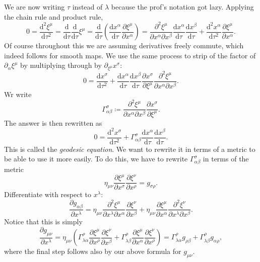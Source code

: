 We are now writing $\tau $ instead of $\lambda $ because the prof's notation got lazy. Applying the chain rule and product rule,
\[
	0=\frac{\mathrm{d}^2\xi ^\mu }{\mathrm{d}\tau ^2} =\frac{\mathrm{d}}{\mathrm{d}\tau } \frac{\mathrm{d}}{\mathrm{d}\tau } \xi ^\mu =\frac{\mathrm{d}}{\mathrm{d}\tau } \left( \frac{\mathrm{d}x^\alpha }{\mathrm{d}\tau } \frac{\partial \xi ^\mu }{\partial x^\alpha }  \right) =\frac{\partial ^2\xi ^\mu }{\partial x^\alpha \partial x^\beta } \frac{\mathrm{d}x^\alpha }{\mathrm{d}\tau } \frac{\mathrm{d}x^\beta }{\mathrm{d}\tau } +\frac{\mathrm{d}^2x^\alpha }{\mathrm{d}\tau ^2} \frac{\partial \xi ^\mu }{\partial x^\alpha } 
.\]
Of course throughout this we are assuming derivatives freely commute, which indeed follows for smooth maps. We use the same process to strip of the factor of $\partial_\alpha \xi ^\mu $ by multiplying through by $\partial_{\xi ^\mu } x^\sigma $:
\[
	0=\frac{\mathrm{d}x^\sigma }{\mathrm{d}\tau ^2} +\frac{\mathrm{d}x^\alpha }{\mathrm{d}\tau } \frac{\mathrm{d}x^\beta }{\mathrm{d}\tau } \frac{\partial x^\sigma }{\partial \xi ^\mu }\frac{\partial ^2\xi ^\mu }{\partial x^\alpha \partial x^\beta } 
.\]
Wr write
\[
	\Gamma _{\alpha \beta } ^\sigma  \coloneqq \frac{\partial ^2\xi ^\mu }{\partial x^\alpha \partial x^\beta } \frac{\partial x^\sigma }{\partial \xi ^\mu } 
.\]
The answer is then rewritten as
\[
	0=\frac{\mathrm{d}^2x^\sigma }{\mathrm{d}\tau ^2} +\Gamma _{\alpha \beta } ^\sigma \frac{\mathrm{d}x^\alpha }{\mathrm{d}\tau } \frac{\mathrm{d}x^\beta }{\mathrm{d}\tau } 
.\]
This is called the \emph{geodesic equation}. We want to rewrite it in terms of a metric to be able to use it more easily. To do this, we have to rewrite $\Gamma _{\alpha \beta } ^\sigma $ in terms of the metric
\[
	\eta _{\mu \nu } \frac{\partial \xi ^\mu }{\partial x^\sigma } \frac{\partial \xi ^\nu }{\partial x^\rho } =g_{\sigma \rho } 
.\]
Differentiate with respect to $x^\lambda $:
\[
	\frac{\partial g_{\alpha \beta } }{\partial x^\lambda } =\eta _{\mu \nu } \frac{\partial ^2\xi ^\mu }{\partial x^\lambda \partial x^\alpha } \frac{\partial \xi ^\nu }{\partial x^\beta } +\eta _{\mu \nu } \frac{\partial \xi ^\mu }{\partial x^\alpha } \frac{\partial ^2\xi ^\nu }{\partial x^\lambda \partial x^\beta } 
.\]
Notice that this is simply
\[
	\frac{\partial g_{\mu \nu } }{\partial x^\lambda } =\eta _{\mu \nu } \left( \Gamma _{\lambda \alpha } ^\rho \frac{\partial \xi ^\mu }{\partial x^\rho } \frac{\partial \xi ^\nu }{\partial x^\beta } +\Gamma _{\lambda \beta } ^\rho \frac{\partial \xi ^\mu }{\partial x^\alpha } \frac{\partial \xi ^\nu }{\partial x^\rho }  \right) =\Gamma^\rho_{\lambda \alpha } g_{\rho \beta } +\Gamma ^\rho _{\lambda \beta } g_{\alpha \rho } ,
\]
where the final step follows also by our above formula for $g_{\mu \nu } $.

